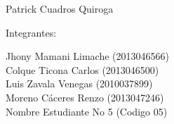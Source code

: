 \documentclass[12pt,letterpaper]{article}
\begin{document}
\begin{titlepage}
\begin{center}
\vspace*{0.1in}
\begin{large}
 Patrick Cuadros Quiroga\\
\end{large}

\vspace*{0.2in}
\vspace*{0.1in}
\begin{large}
Integrantes: \\
\begin{flushleft}
Jhony Mamani Limache		\hfill	(2013046566) \\
Colque Ticona Carlos 		\hfill	(2013046500) \\
Luis Zavala Venegas            	\hfill	(2010037899) \\
Moreno C\'aceres Renzo      	\hfill	(2013047246) \\
Nombre Estudiante No 5       	\hfill	(Codigo 05) \\
\end{flushleft}
\end{large}
\end{center}

\end{titlepage}


\tableofcontents %
\thispagestyle{empty} %
\newpage
\setcounter{page}{1} %











\end{document}
